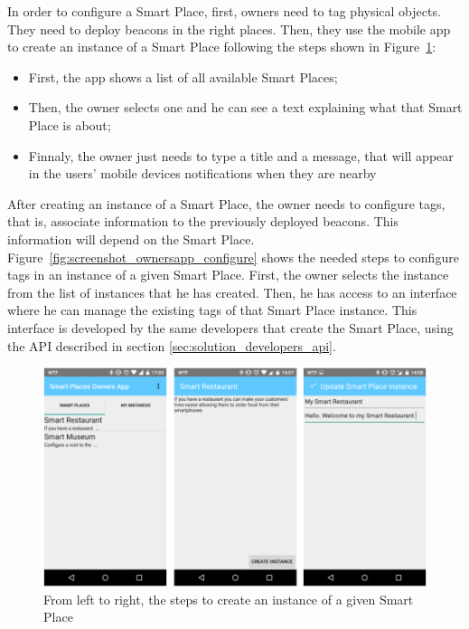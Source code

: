 In order to configure a Smart Place, first, owners need to tag physical objects.
They need to deploy beacons in the right places.
Then, they use the mobile app to create an instance of a Smart Place following the steps shown in Figure~\ref{fig:screenshot_ownersapp}:
\begin{itemize}
  \item First, the app shows a list of all available Smart Places;
  \item Then, the owner selects one and he can see a text explaining what that Smart Place is about;
  \item Finnaly, the owner just needs to type a title and a message, that will appear in the users' mobile devices notifications when they are nearby
\end{itemize}

After creating an instance of a Smart Place, the owner needs to configure tags, that is, associate information to the previously deployed beacons.
This information will depend on the Smart Place.
Figure~\ref{fig:screenshot_ownersapp_configure} shows the needed steps to configure tags in an instance of a given Smart Place.
First, the owner selects the instance from the list of instances that he has created.
Then, he has access to an interface where he can manage the existing tags of that Smart Place instance.
This interface is developed by the same developers that create the Smart Place, using the \gls{API} described in section \ref{sec:solution_developers_api}.

\begin{figure}[!ht]
  \centering
    \includegraphics[width=1\textwidth, keepaspectratio]{images/screenshots/ownersapp}
    \caption[Create a Smart Place Instance]{From left to right, the steps to create an instance of a given Smart Place}
    \label{fig:screenshot_ownersapp}
\end{figure}

